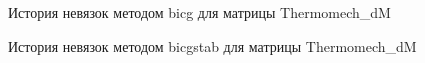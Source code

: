 \begin{figure}[H]
    \renewcommand{\figurename}{Рисунок}
    \caption{История невязок методом bicg для матрицы Thermomech\_dM}
    \label{fig:image_23}
\end{figure}

\begin{figure}[H]
    \renewcommand{\figurename}{Рисунок}
    \caption{История невязок методом bicgstab для матрицы Thermomech\_dM}
    \label{fig:image_24}
\end{figure}

